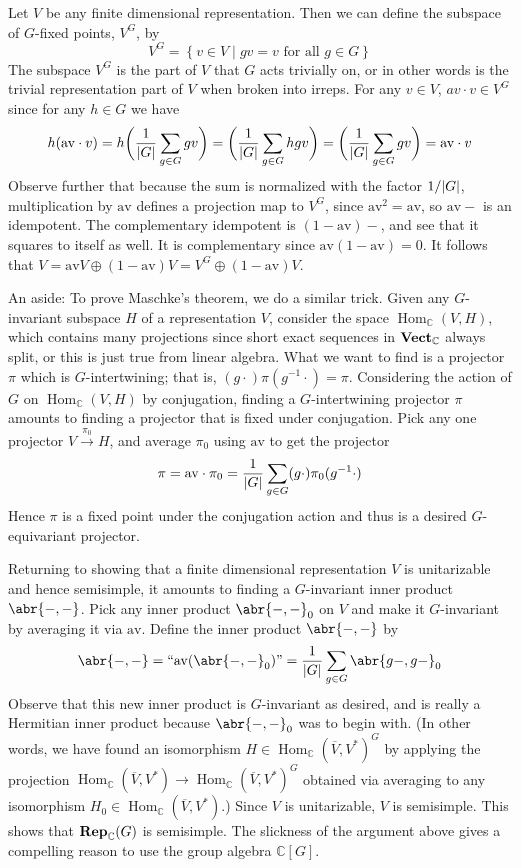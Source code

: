 \documentclass[11pt,leqno]{article}
\theoremstyle{plain}
\theoremstyle{definition}
\numberwithin{equation}{section}
\numberwithin{lem}{section}
\newcommand{\cbr}[1]{\left\{#1\right\}}
\DeclareMathOperator{\Hom}{Hom}
\newcommand{\catname}[1]{{\normalfont\mathbf{#1}}}
\newcommand{\Vect}{\catname{Vect}}
\newcommand{\Rep}{\catname{Rep}}
\newcommand{\av}{\mathrm{av}}
\begin{document}
Let $V$ be any finite dimensional representation. Then we can define the subspace of $G$-fixed points, $V^G$, by
\[V^G = \cbr{v\in V\mid gv = v\text{ for all }g\in G}\]
The subspace $V^G$ is the part of $V$ that $G$ acts trivially on, or in other words is the trivial representation part of $V$ when broken into irreps. For any $v\in V$, $av\cdot v\in V^G$ since for any $h\in G$ we have
\[h(\av\cdot v) = h\biggl(\frac{1}{\abs{G}}\sum_{g\in G}gv\biggr) = \biggl(\frac{1}{\abs{G}}\sum_{g\in G}hgv\biggr) = \biggl(\frac{1}{\abs{G}}\sum_{g\in G}gv\biggr) = \av\cdot v\]
Observe further that because the sum is normalized with the factor $1/\abs{G}$, multiplication by $\av$ defines a projection map to $V^G$, since $\av^2 = \av$, so $\av-$ is an idempotent. The complementary idempotent is $(1-\av)-$, and see that it squares to itself as well. It is complementary since $\av(1-\av) = 0$. It follows that $V = \av V\oplus (1-\av)V = V^G\oplus (1-\av)V$.

An aside: To prove Maschke's theorem, we do a similar trick. Given any $G$-invariant subspace $H$ of a representation $V$, consider the space $\Hom_{\mathbb C}(V,H)$, which contains many projections since short exact sequences in $\Vect_{\mathbb C}$ always split, or this is just true from linear algebra. What we want to find is a projector $\pi$ which is $G$-intertwining; that is, $(g\cdot)\pi(g^{-1}\cdot) = \pi$. Considering the action of $G$ on $\Hom_{\mathbb C}(V,H)$ by conjugation, finding a $G$-intertwining projector $\pi$ amounts to finding a projector that is fixed under conjugation. Pick any one projector $V\xrightarrow{\pi_0}H$, and average $\pi_0$ using $\av$ to get the projector
\[\pi = \av\cdot\pi_0 = \frac{1}{\abs{G}}\sum_{g\in G}(g\cdot)\pi_0(g^{-1}\cdot)\]
Hence $\pi$ is a fixed point under the conjugation action and thus is a desired $G$-equivariant projector.

Returning to showing that a finite dimensional representation $V$ is unitarizable and hence semisimple, it amounts to finding a $G$-invariant inner product $\abr{-,-}$. Pick any inner product $\abr{-,-}_0$ on $V$ and make it $G$-invariant by averaging it via $\av$. Define the inner product $\abr{-,-}$ by 
\[\abr{-,-} = ``\av(\abr{-,-}_0)\textrm{''} = \frac{1}{\abs{G}}\sum_{g\in G}\abr{g-,g-}_0\]
Observe that this new inner product is $G$-invariant as desired, and is really a Hermitian inner product because $\abr{-,-}_0$ was to begin with. (In other words, we have found an isomorphism $H\in \Hom_{\mathbb C}(\overline V, V^\ast)^G$ by applying the projection $\Hom_{\mathbb C}(\overline V, V^\ast)\to \Hom_{\mathbb C}(\overline V, V^\ast)^G$ obtained via averaging to any isomorphism $H_0\in \Hom_{\mathbb C}(\overline V, V^\ast)$.) Since $V$ is unitarizable, $V$ is semisimple. This shows that $\Rep_{\mathbb C}(G)$ is semisimple. The slickness of the argument above gives a compelling reason to use the group algebra $\mathbb C[G]$.
\end{document}
